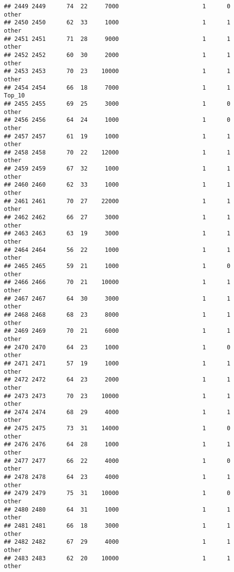 \documentclass[
]{article}
\begin{document}
\begin{verbatim}
## 2449 2449      74  22     7000                        1      0    other
## 2450 2450      62  33     1000                        1      1    other
## 2451 2451      71  28     9000                        1      1    other
## 2452 2452      60  30     2000                        1      1    other
## 2453 2453      70  23    10000                        1      1    other
## 2454 2454      66  18     7000                        1      1   Top_10
## 2455 2455      69  25     3000                        1      0    other
## 2456 2456      64  24     1000                        1      0    other
## 2457 2457      61  19     1000                        1      1    other
## 2458 2458      70  22    12000                        1      1    other
## 2459 2459      67  32     1000                        1      1    other
## 2460 2460      62  33     1000                        1      1    other
## 2461 2461      70  27    22000                        1      1    other
## 2462 2462      66  27     3000                        1      1    other
## 2463 2463      63  19     3000                        1      1    other
## 2464 2464      56  22     1000                        1      1    other
## 2465 2465      59  21     1000                        1      0    other
## 2466 2466      70  21    10000                        1      1    other
## 2467 2467      64  30     3000                        1      1    other
## 2468 2468      68  23     8000                        1      1    other
## 2469 2469      70  21     6000                        1      1    other
## 2470 2470      64  23     1000                        1      0    other
## 2471 2471      57  19     1000                        1      1    other
## 2472 2472      64  23     2000                        1      1    other
## 2473 2473      70  23    10000                        1      1    other
## 2474 2474      68  29     4000                        1      1    other
## 2475 2475      73  31    14000                        1      0    other
## 2476 2476      64  28     1000                        1      1    other
## 2477 2477      66  22     4000                        1      0    other
## 2478 2478      64  23     4000                        1      1    other
## 2479 2479      75  31    10000                        1      0    other
## 2480 2480      64  31     1000                        1      1    other
## 2481 2481      66  18     3000                        1      1    other
## 2482 2482      67  29     4000                        1      1    other
## 2483 2483      62  20    10000                        1      1    other

\end{verbatim}
\end{document}
